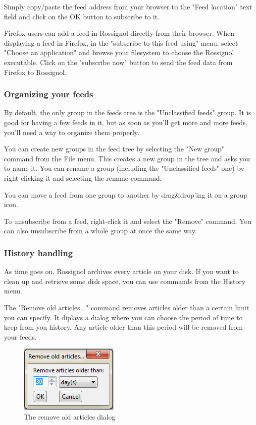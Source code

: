\documentclass[11pt]{article} %
\begin{document}
Simply copy/paste the feed address from your browser to the "Feed location" 
text field and click on the OK button to subscribe to it.

Firefox users can add a feed in Rossignol directly from their browser. 
When displaying a feed in Firefox, in the "subscribe to this feed using" menu, 
select "Choose an application" and browse your filesystem to choose the 
Rossignol executable. Click on the "subscribe now" button to send the feed data 
from Firefox to Rossignol. 

\subsubsection{Organizing your feeds}

By default, the only group in the feeds tree is the "Unclassified feeds" group. 
It is good for having a few feeds in it, but as soon as you'll get more and more
feeds, you'll need a way to organize them properly.

You can create new groups in the feed tree by selecting the "New group" command 
from the File menu. This creates a new group in the tree and asks you to name 
it. You can rename a group (including the "Unclassified feeds" one) by 
right-clicking it and selecting the rename command. 

You can move a feed from one group to another by drag\&drop'ing it on a group 
icon. 

To unsubscribe from a feed, right-click it and select the "Remove" command. You
can also unsubscribe from a whole group at once the same way. 

\subsubsection{History handling}

As time goes on, Rossignol archives every article on your disk. If you want to 
clean up and retrieve some disk space, you can use commands from the History 
menu.

The "Remove old articles..." command removes articles older than a certain limit 
you can specify. It diplays a dialog where you can choose the period of time 
to keep from you history. Any article older than this period will be removed 
from your feeds. 

\begin{figure}[h]
\centering
\includegraphics{img/remove_old_articles_dialog.png}
\caption{The remove old articles dialog}
\end{figure}
\end{document}
